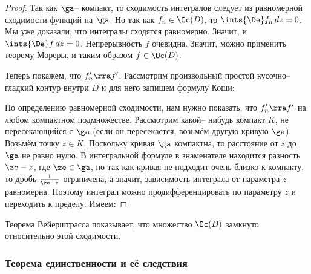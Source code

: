 \documentclass[a4paper]{article}
\begin{document}
\begin{proof}
Так как $\ga$-- компакт, то сходимость интегралов следует из равномерной сходимости функций на $\ga$.
Но так как $f_n \in \Oc(D)$, то $\ints{\De} f_n\,dz=0$. Мы уже доказали, что интегралы сходятся равномерно.
Значит, и $\ints{\De} f\,dz=0$. Непрерывность $f$ очевидна. Значит, можно применить теорему Мореры,
и таким образом $f \in \Oc(D)$.

Теперь покажем, что $f'_n \rra f'$. Рассмотрим произвольный простой кусочно-- гладкий контур внутри $D$ и для
него запишем формулу Коши:

По определению равномерной сходимости, нам нужно показать, что $f'_n \rra f'$ на любом компактном подмножестве.
Рассмотрим какой-- нибудь компакт $K$, не пересекающийся с $\ga$ (если он пересекается, возьмём другую кривую $\ga$).
Возьмём точку $z \in K$. Поскольку кривая $\ga$ компактна, то расстояние от $z$ до $\ga$ не равно нулю.
В интегральной формуле в знаменателе находится разность $\ze-z$, где $\ze \in \ga$, но так как кривая не подходит
очень близко к компакту, то дробь $\frac{1}{\ze-z}$ ограничена, а значит, зависимость интеграла от
параметра $z$ равномерна. Поэтому интеграл можно продифференцировать по параметру $z$ и переходить к пределу.
Имеем:
\hfill\end{proof}

Теорема Вейерштрасса показывает, что множество $\Oc(D)$ замкнуто относительно этой сходимости.

\subsubsection{Теорема единственности и её следствия}
\end{document}
